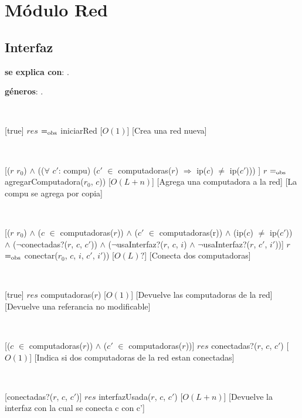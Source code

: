 \section{Módulo Red}

\subsection{Interfaz}

\textbf{se explica con}: .

\textbf{géneros}: .

  ~

  [true]
  {$res$ $=_{\mathrm{obs}}$ iniciarRed}
  [$O(1)$]
  [Crea una red nueva]
  

  ~

  [($r$ \igobs $r_0$) $\land$ (($\forall$ $c'$: compu) ($c'$ $\in$ computadoras($r$) $\Rightarrow$  ip($c$) $\neq$  ip($c'$)))  ]
  {$r$ $=_{\mathrm{obs}}$ agregarComputadora($r_0$, $c$)) }
  [$O(L + n)$]
  [Agrega una computadora a la red]
  [La compu se agrega por copia]

  ~

  [($r$ \igobs $r_0$) $\land$ ($c$ $\in$ computadoras($r$)) $\land$ ($c'$ $\in$ computadoras(r)) $\land$ (ip($c$) $\neq$ ip($c'$)) \\
   $\land$ ($\neg$conectadas?($r$, $c$, $c'$)) $\land$ ($\neg$usaInterfaz?($r$, $c$, $i$) $\land$ $\neg$usaInterfaz?($r$, $c'$, $i'$))]
  {$r$ $=_{\mathrm{obs}}$ conectar($r_0$, $c$, $i$, $c'$, $i'$))}
  [$O(L) ?$]
  [Conecta dos computadoras]

  ~

  [true]
  {$res$ \igobs computadoras($r$)}
  [$O(1)$]
  [Devuelve las computadoras de la red]
  [Devuelve una referancia no modificable]

  ~

  [($c$ $\in$ computadoras($r$)) $\land$ ($c'$ $\in$ computadoras($r$))]
  {$res$ \igobs conectadas?($r$, $c$, $c'$)}
  [$O(1)$]
  [Indica si dos computadoras de la red estan conectadas]

  ~

  [conectadas?($r$, $c$, $c'$)]
  {$res$ \igobs interfazUsada($r$, $c$, $c'$)}
  [$O(L + n)$]
  [Devuelve la interfaz con la cual se conecta c con c']

